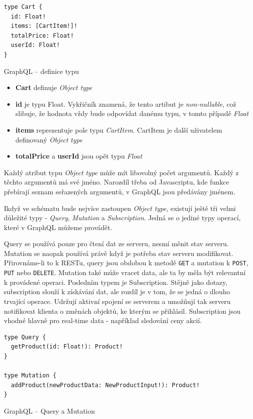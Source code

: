 \documentclass[thesis=M,czech]{FITthesis}[2019/12/23]
\begin{document}
\begin{listing}[H]
\begin{verbatim}
type Cart {
  id: Float!
  items: [CartItem!]!
  totalPrice: Float!
  userId: Float!
}
\end{verbatim}
\caption{GraphQL -- definice typu}
\label{lst:graphql_type}
\end{listing}

\begin{itemize}
    \item \textbf{Cart} definuje \textit{Object type}
    \item \textbf{id} je typu Float. Vykřičník znamená, že tento artibut je \textit{non-nullable}, což slibuje, že hodnota vždy bude odpovídat danému typu, v tomto případě \textit{Float}
    \item \textbf{items} reprezentuje pole typu \textit{CartItem}. CartItem je další uživatelem definovaný \textit{Object type}
    \item \textbf{totalPrice} a \textbf{userId} jsou opět typu \textit{Float}
\end{itemize}

Každý atribut typu \textit{Object type} může mít libovolný počet argumentů. Každý z těchto argumentů má své jméno. Narozdíl třeba od Javascriptu, kde funkce přebírají seznam seřazených argumentů, v GraphQL jsou předávány jménem.

Ikdyž ve schématu bude nejvíce zastoupen \textit{Object type}, existují ještě tři velmi důležité typy - \textit{Query}, \textit{Mutation} a \textit{Subscription}. Jedná se o jediné typy operací, které v GraphQL můžeme provádět.

Query se používá pouze pro čtení dat ze serveru, nesmí měnit stav serveru. Mutation se naopak používá právě když je potřeba stav serveru modifikovat. Přirovnáme-li to k RESTu, query jsou obdobou k metodě \texttt{GET} a mutation k \texttt{POST}, \texttt{PUT} nebo \texttt{DELETE}. Mutation také může vracet data, ale ta by měla být relevantní k provádené operaci.
Posledním typem je Subscription. Stějně jako dotazy, subscription slouží k získávání dat, ale rozdíl je v tom, že se jedná o dlouho trvající operace. Udržují aktivní spojení se serverem a umožňují tak serveru notifikovat klienta o změnách objektů, ke kterým se přihlásil. Subscription jsou vhodné hlavně pro real-time data - například sledování ceny akcií.

\begin{listing}[H]
\begin{verbatim}
type Query {    
  getProduct(id: Float!): Product!
}

type Mutation {
  addProduct(newProductData: NewProductInput!): Product!
}
\end{verbatim}
\caption{GraphQL -- Query a Mutation}
\label{lst:graphql_query_mutation}
\end{listing}
\end{document}
